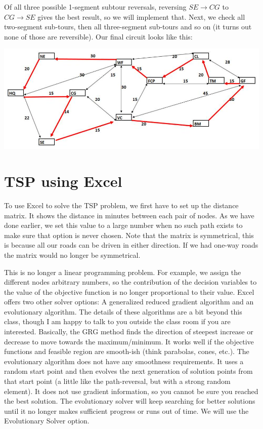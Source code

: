 \documentclass[10pt]{article}
\begin{document}
Of all three possible 1-segment subtour reversals, reversing $S E \rightarrow C G$ to $C G \rightarrow S E$ gives the best result, so we will implement that. Next, we check all two-segment sub-tours, then all three-segment sub-tours and so on (it turns out none of those are reversible). Our final circuit looks like this:

\includegraphics[max width=\textwidth]{2022_07_05_5945264bba2a5f6ba667g-57}

\section{TSP using Excel}
To use Excel to solve the TSP problem, we first have to set up the distance matrix. It shows the distance in minutes between each pair of nodes. As we have done earlier, we set this value to a large number when no such path exists to make sure that option is never chosen. Note that the matrix is symmetrical, this is because all our roads can be driven in either direction. If we had one-way roads the matrix would no longer be symmetrical.

This is no longer a linear programming problem. For example, we assign the different nodes arbitrary numbers, so the contribution of the decision variables to the value of the objective function is no longer proportional to their value. Excel offers two other solver options: A generalized reduced gradient algorithm and an evolutionary algorithm. The details of these algorithms are a bit beyond this class, though I am happy to talk to you outside the class room if you are interested. Basically, the GRG method finds the direction of steepest increase or decrease to move towards the maximum/minimum. It works well if the objective functions and feasible region are smooth-ish (think parabolas, cones, etc.). The evolutionary algorithm does not have any smoothness requirements. It uses a random start point and then evolves the next generation of solution points from that start point (a little like the path-reversal, but with a strong random element). It does not use gradient information, so you cannot be sure you reached the best solution. The evolutionary solver will keep searching for better solutions until it no longer makes sufficient progress or runs out of time. We will use the Evolutionary Solver option.
\end{document}
